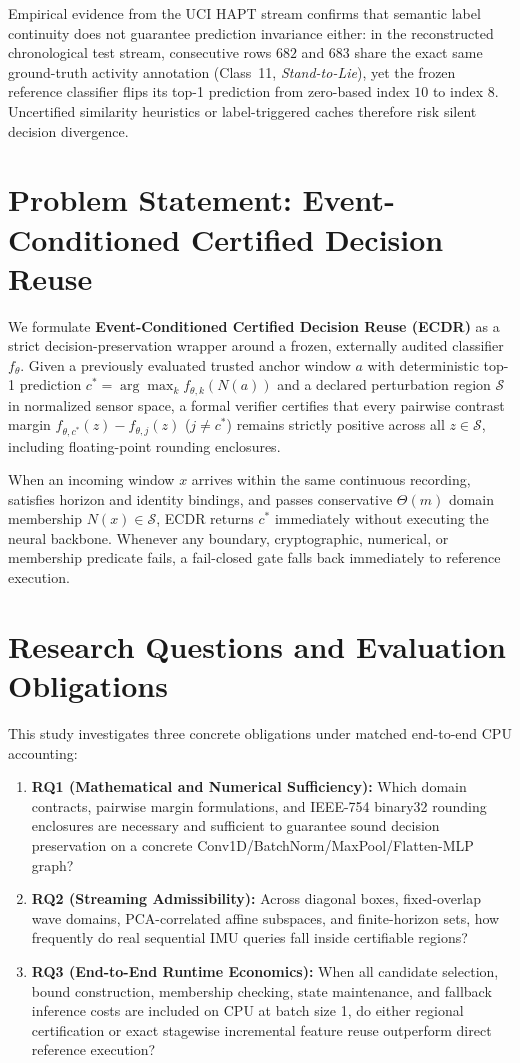 \documentclass[11pt,oneside,a4paper]{report}
\newcommand{\code}[1]{{\small\upshape\ttfamily #1}}
\newcommand{\Sset}{\mathcal{S}}
\theoremstyle{remark}
\begin{document}
Empirical evidence from the UCI HAPT stream confirms that semantic label continuity does not guarantee prediction invariance either: in the reconstructed chronological test stream, consecutive rows $682$ and $683$ share the exact same ground-truth activity annotation (Class~11, \textit{Stand-to-Lie}), yet the frozen reference classifier flips its top-1 prediction from zero-based index $10$ to index $8$. Uncertified similarity heuristics or label-triggered caches therefore risk silent decision divergence.

\section{Problem Statement: Event-Conditioned Certified Decision Reuse}
We formulate \textbf{Event-Conditioned Certified Decision Reuse (ECDR)} as a strict decision-preservation wrapper around a frozen, externally audited classifier $f_\theta$. Given a previously evaluated trusted anchor window $a$ with deterministic top-1 prediction $c^* = \arg\max_k f_{\theta,k}(N(a))$ and a declared perturbation region $\Sset$ in normalized sensor space, a formal verifier certifies that every pairwise contrast margin $f_{\theta,c^*}(z) - f_{\theta,j}(z)$ ($j \neq c^*$) remains strictly positive across all $z \in \Sset$, including floating-point rounding enclosures.

When an incoming window $x$ arrives within the same continuous recording, satisfies horizon and identity bindings, and passes conservative $\Theta(m)$ domain membership $N(x) \in \Sset$, ECDR returns $c^*$ immediately without executing the neural backbone. Whenever any boundary, cryptographic, numerical, or membership predicate fails, a fail-closed gate falls back immediately to reference execution.

\section{Research Questions and Evaluation Obligations}
This study investigates three concrete obligations under matched end-to-end CPU accounting:
\begin{enumerate}[leftmargin=1.5em]
  \item \textbf{RQ1 (Mathematical and Numerical Sufficiency):} Which domain contracts, pairwise margin formulations, and IEEE-754 \code{binary32} rounding enclosures are necessary and sufficient to guarantee sound decision preservation on a concrete Conv1D/BatchNorm/MaxPool/Flatten-MLP graph?
  \item \textbf{RQ2 (Streaming Admissibility):} Across diagonal boxes, fixed-overlap wave domains, PCA-correlated affine subspaces, and finite-horizon sets, how frequently do real sequential IMU queries fall inside certifiable regions?
  \item \textbf{RQ3 (End-to-End Runtime Economics):} When all candidate selection, bound construction, membership checking, state maintenance, and fallback inference costs are included on CPU at batch size 1, do either regional certification or exact stagewise incremental feature reuse outperform direct reference execution?
\end{enumerate}
\end{document}
